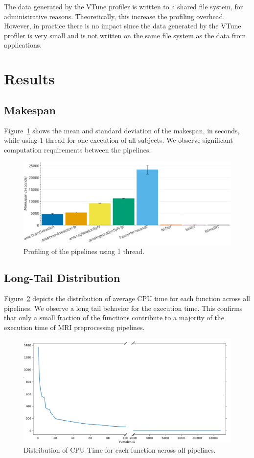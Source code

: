 \documentclass[conference]{IEEEtran}
\begin{document}
The data generated by the VTune profiler is written to a shared file system, for administrative reasons. Theoretically, this increase the profiling overhead. However, in practice there is no impact since the data generated by the VTune profiler is very small and is not written on the same file system as the data from applications.

\section{Results}
\subsection{Makespan}
Figure~\ref{fig:makespan-1thread} shows the mean and standard deviation of the makespan, in seconds, while using 1 thread for one execution of all subjects.
We observe significant computation requirements between the pipelines.
\begin{figure}[h!]
	\centering
	\includegraphics[width=\linewidth]{figures/makespan-1thread.png}
	\caption{Profiling of the pipelines using 1 thread.}
	\label{fig:makespan-1thread}
\end{figure}

\subsection{Long-Tail Distribution}
Figure~\ref{fig:longtail} depicts the distribution of average CPU time for each function across all pipelines. We observe a long tail behavior for the execution time. 
This confirms that only a small fraction of the functions contribute to a majority of the execution time of MRI preprocessing pipelines.


\begin{figure}[h!]
	\centering
	\includegraphics[width=\linewidth]{figures/global_longtail.png}
	\caption{Distribution of CPU Time for each function across all pipelines.}
	\label{fig:longtail}
\end{figure}
	
\end{document}

